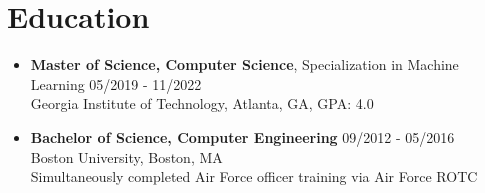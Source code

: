 \documentclass{article}
\begin{document}

\section{Education} \begin{itemize}
    \itemsep0.2em
    \item \textbf{Master of Science, Computer Science}, Specialization in Machine Learning \hfill 05/2019 - 11/2022\\Georgia Institute of Technology, Atlanta, GA, GPA: 4.0
    \item \textbf{Bachelor of Science, Computer Engineering} \hfill 09/2012 - 05/2016\\Boston University, Boston, MA\\Simultaneously completed Air Force officer training via Air Force ROTC  \end{itemize} 

\end{document}
